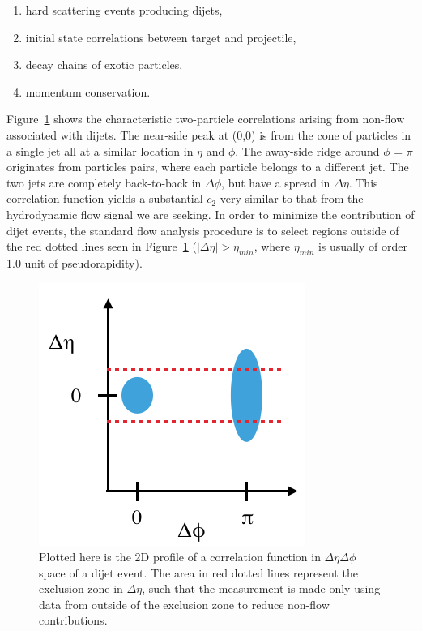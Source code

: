 \begin{enumerate}
\item hard scattering events producing dijets,
\item initial state correlations between target and projectile,
\item decay chains of exotic particles,
\item momentum conservation.
\end{enumerate}

Figure~\ref{fig:jet_corr_example} shows the characteristic two-particle correlations arising from non-flow associated with dijets. The near-side peak at (0,0) is from the cone of particles in a single jet all at a similar location in $\eta$ and $\phi$. The away-side ridge around $\phi$ = $\pi$ originates from particles pairs, where each particle belongs to a different jet. The two jets are completely back-to-back in $\Delta\phi$, but have a spread in $\Delta\eta$. This correlation function yields a substantial $c_2$ very similar to that from the hydrodynamic flow signal we are seeking. In order to minimize the contribution of dijet events, the standard flow analysis procedure is to select regions outside of the red dotted lines seen in Figure~\ref{fig:jet_corr_example} ($|\Delta\eta| > \eta_{min}$, where $\eta_{min}$ is usually of order 1.0 unit of pseudorapidity).

\begin{figure}[!h]
\begin{center}
\includegraphics[width=0.5\linewidth]{figs/jet_corr_example.png}
\caption{Plotted here is the 2D profile of a correlation function in $\Delta\eta \Delta\phi$ space of a dijet event. The area in red dotted lines represent the exclusion zone in $\Delta\eta$, such that the measurement is made only using data from outside of the exclusion zone to reduce non-flow contributions.}
\label{fig:jet_corr_example}
\end{center}
\end{figure}

